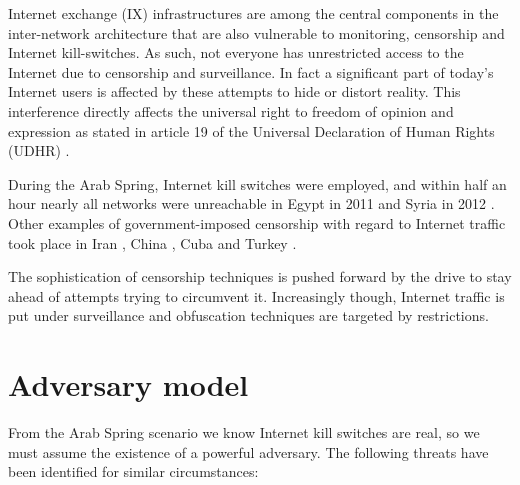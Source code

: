 Internet exchange (IX) infrastructures are among the central components in the inter-network architecture that are also vulnerable to monitoring, censorship and Internet kill-switches.
As such, not everyone has unrestricted access to the Internet due to censorship and surveillance.
In fact a significant part of today's Internet users is affected by these attempts to hide or distort reality. %
This interference directly affects the universal right to freedom of opinion and expression as stated in article 19 of the Universal Declaration of Human Rights (UDHR) \cite{UDHR}.

During the Arab Spring, Internet kill switches were employed, and within half an hour nearly all networks were unreachable in Egypt in 2011 \cite{renesys2011egypt} and Syria in 2012 \cite{renesys2012syria}.
Other examples of government-imposed censorship with regard to Internet traffic took place in Iran \cite{halderman2013iran}, China \cite{nyt2015appleChina, hrw2006china}, Cuba \cite{watts2014havana} and Turkey \cite{twitter2015turkey}.

The sophistication of censorship techniques is pushed forward by the drive to stay ahead of attempts trying to circumvent it.
Increasingly though, Internet traffic is put under surveillance and obfuscation techniques are targeted by restrictions. \cite{survey_brussee}


\section{Adversary model}\label{sec:adversary_model}
From the Arab Spring scenario we know Internet kill switches are real, so we must assume the existence of a powerful adversary.
The following threats \cite{ietf-shadow-internet} have been identified for similar circumstances:

